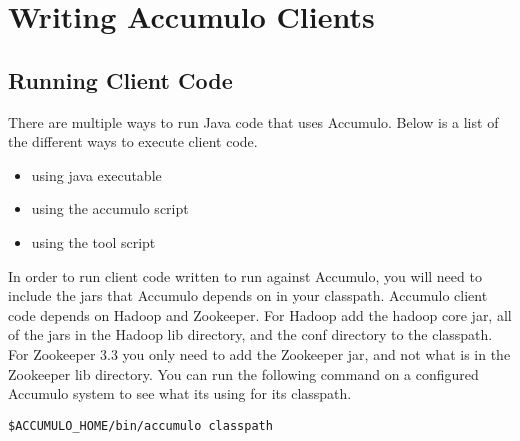 
%
%

\chapter{Writing Accumulo Clients}

\section{Running Client Code}

There are multiple ways to run Java code that uses Accumulo.  Below is a list
of the different ways to execute client code.

\begin{itemize} 
  \item using java executable 
  \item using the accumulo script
  \item using the tool script 
\end{itemize}

In order to run client code written to run against Accumulo, you will need to
include the jars that Accumulo depends on in your classpath.  Accumulo client
code depends on Hadoop and Zookeeper.  For Hadoop add the hadoop core jar, all
of the jars in the Hadoop lib directory, and the conf directory to the
classpath. For Zookeeper 3.3 you only need to add the Zookeeper jar, and not
what is in the Zookeeper lib directory.  You can run the following command on a
configured Accumulo system to see what its using for its classpath.

\small 
\begin{verbatim} 
$ACCUMULO_HOME/bin/accumulo classpath 
\end{verbatim}
\normalsize

